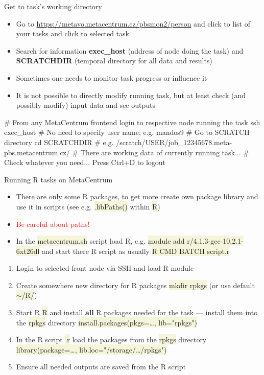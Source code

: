 \documentclass[compress, xelatex, 11pt, xcolor=svgnames, aspectratio=169,
	hyperref={
		bookmarks=true,
		unicode=true,
		colorlinks=true,
		pdftitle={Linux, command line and MetaCentrum},
		plainpages=false,
		pdfauthor={Vojtech Zeisek},
		pdfsubject={Course about use of Linux command line, writing shell scripts and using MetaCentrum of CESNET},
		pdfcreator={XeLaTeX},
		pdfkeywords={Linux, GNU, BASH, shell, command line, MetaCentrum},
		linkcolor=DarkRed, %
		anchorcolor=DarkBlue, %
		citecolor=Indigo, %
		filecolor=NavyBlue, %
		menucolor=DarkMagenta, %
		urlcolor=DarkBlue, %
		},
	url={hyphens, lowtilde} %
	]{beamer}
\renewcommand{\texttt}[1]{\colorbox{Beige}{{\ttfamily #1}}}
\renewcommand{\alert}[1]{\textcolor{red}{#1}}
\begin{document}
\begin{frame}[fragile]{Get to task's working directory}
	\begin{itemize}
		\item Go to \url{https://metavo.metacentrum.cz/pbsmon2/person} and click to list of your tasks and click to selected task
		\item Search for information \textbf{exec\_host} (address of node doing the task) and \textbf{SCRATCHDIR} (temporal directory for all data and results)
		\item Sometimes one needs to monitor task progress or influence it
		\item It is not possible to directly modify running task, but at least check (and possibly modify) input data and see outputs
	\end{itemize}
	\begin{bashcode}
    # From any MetaCentrum frontend login to respective node running the task
    ssh exec_host # No need to specify user name; e.g. mandos9
    # Go to SCRATCH directory
    cd SCRATCHDIR # e.g. /scratch/USER/job_12345678.meta-pbs.metacentrum.cz/
    # There are working data of currently running task...
    # Check whatever you need... Press Ctrl+D to logout
	\end{bashcode}
\end{frame}

\begin{frame}{Running R tasks on MetaCentrum}
	\begin{itemize}
		\item There are only some R packages, to get more create own package library and use it in scripts (see e.g. \texttt{.libPaths()} within \texttt{R})
		\item \alert{Be careful about paths!}
		\item In the \texttt{metacentrum.sh} script load R, e.g. \texttt{module add r/4.1.3-gcc-10.2.1-6xt26dl} and start there R script as usually \texttt{R CMD BATCH script.r}
	\end{itemize}
	\begin{enumerate}
		\item Login to selected front node via SSH and load R module
		\item Create somewhere new directory for R packages \texttt{mkdir rpkgs} (or use default \texttt{$\sim$/R/})
		\item Start R \texttt{R} and install \textbf{all} R packages needed for the task --- install them into the \texttt{rpkgs} directory \texttt{install.packages(pkgs=\ldots, lib="rpkgs")}
		\item In the R script \texttt{*.r} load the packages from the \texttt{rpkgs} directory \texttt{library(package=\ldots, lib.loc="/storage/\ldots/rpkgs")}
		\item Ensure all needed outputs are saved from the R script
	\end{enumerate}
\end{frame}
\end{document}
